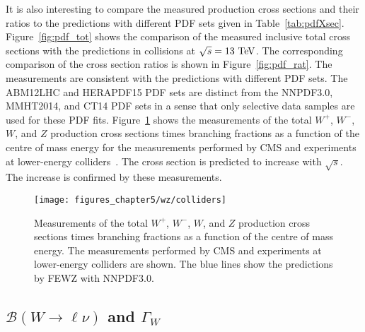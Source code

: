 It is also interesting to compare the measured production cross sections and their ratios to the predictions with different PDF sets given in Table~\ref{tab:pdfXsec}. Figure~\ref{fig:pdf_tot} shows the comparison of the measured inclusive total cross sections with the predictions in collisions at $\sqrt{s}=13~\mathrm{Te\kern -0.1em V}$. The corresponding comparison of the cross section ratios is shown in Figure~\ref{fig:pdf_rat}. The measurements are consistent with the predictions with different PDF sets. The ABM12LHC and HERAPDF15 PDF sets are distinct from the NNPDF3.0, MMHT2014, and CT14 PDF sets in a sense that only selective data samples are used for these PDF fits. Figure~\ref{fig:collider} shows the measurements of the total $W^+$, $W^-$, $W$, and $Z$ production cross sections times branching fractions as a function of the centre of mass energy for the measurements performed by CMS and experiments at lower-energy colliders~\cite{UA1-wz, UA2-wz, CDF-wz-e, CDF-z-m, CDF-wz, D0-w}. The cross section is predicted to increase with $\sqrt{s}$. The increase is confirmed by these measurements.
\begin{figure}[tbh]
\centering
\texttt{[image: figures\_chapter5/wz/colliders]}
\caption{Measurements of the total $W^+$, $W^-$, $W$, and $Z$ production cross sections times branching fractions as a function of the centre of mass energy. The measurements performed by CMS and experiments at lower-energy colliders are shown. The blue lines show the predictions by FEWZ with NNPDF3.0.}
\label{fig:collider}
\end{figure}

\subsection{$\mathcal{B}(W \rightarrow \ell \nu)$ and $\Gamma_W$}

